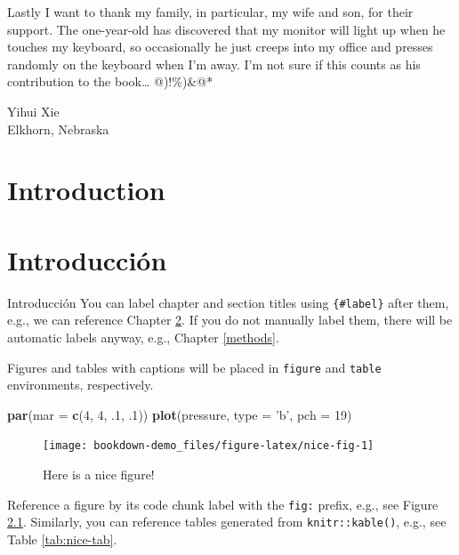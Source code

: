 \documentclass[12pt,]{krantz}
\newenvironment{Shaded}{\begin{snugshade}}{\end{snugshade}}
\newcommand{\DataTypeTok}[1]{\textcolor[rgb]{0.13,0.29,0.53}{#1}}
\newcommand{\DecValTok}[1]{\textcolor[rgb]{0.00,0.00,0.81}{#1}}
\newcommand{\FloatTok}[1]{\textcolor[rgb]{0.00,0.00,0.81}{#1}}
\newcommand{\KeywordTok}[1]{\textcolor[rgb]{0.13,0.29,0.53}{\textbf{#1}}}
\newcommand{\NormalTok}[1]{#1}
\newcommand{\StringTok}[1]{\textcolor[rgb]{0.31,0.60,0.02}{#1}}
\let\BeginKnitrBlock\begin \let\EndKnitrBlock\end
\begin{document}
Lastly I want to thank my family, in particular, my wife and son, for their support. The one-year-old has discovered that my monitor will light up when he touches my keyboard, so occasionally he just creeps into my office and presses randomly on the keyboard when I'm away. I'm not sure if this counts as his contribution to the book\ldots{} @)!\%)\&@*

\BeginKnitrBlock{flushright}
Yihui Xie\\
Elkhorn, Nebraska
\EndKnitrBlock{flushright}

\hypertarget{author}{%
\chapter{Introduction}\label{author}}

\hypertarget{intro}{%
\chapter{Introducción}\label{intro}}

Introducción You can label chapter and section titles using \texttt{\{\#label\}} after them, e.g., we can reference Chapter \ref{intro}. If you do not manually label them, there will be automatic labels anyway, e.g., Chapter \ref{methods}.

Figures and tables with captions will be placed in \texttt{figure} and \texttt{table} environments, respectively.

\begin{Shaded}
\begin{Highlighting}[]
\KeywordTok{par}\NormalTok{(}\DataTypeTok{mar =} \KeywordTok{c}\NormalTok{(}\DecValTok{4}\NormalTok{, }\DecValTok{4}\NormalTok{, }\FloatTok{.1}\NormalTok{, }\FloatTok{.1}\NormalTok{))}
\KeywordTok{plot}\NormalTok{(pressure, }\DataTypeTok{type =} \StringTok{'b'}\NormalTok{, }\DataTypeTok{pch =} \DecValTok{19}\NormalTok{)}
\end{Highlighting}
\end{Shaded}

\begin{figure}

{\centering \texttt{[image: bookdown-demo\_files/figure-latex/nice-fig-1]} 

}

\caption{Here is a nice figure!}\label{fig:nice-fig}
\end{figure}

Reference a figure by its code chunk label with the \texttt{fig:} prefix, e.g., see Figure \ref{fig:nice-fig}. Similarly, you can reference tables generated from \texttt{knitr::kable()}, e.g., see Table \ref{tab:nice-tab}.
\end{document}
